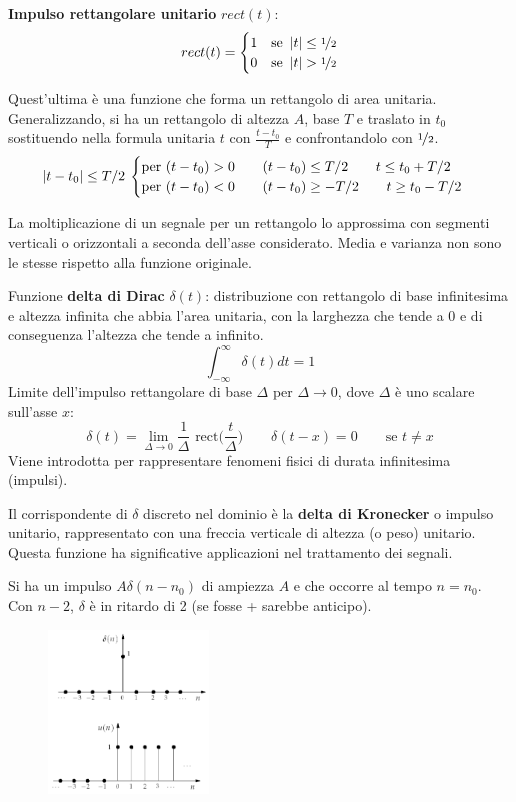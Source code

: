 \textbf{Impulso rettangolare unitario} $rect(t)$:
$$rect(t) = \begin{cases}
1 & \text{se } \left|t\right| \leq \nicefrac{1}{2} \\
0 & \text{se } \left|t\right| > \nicefrac{1}{2}
\end{cases}$$

Quest'ultima è una funzione che forma un rettangolo di area unitaria. Generalizzando, si ha un rettangolo di altezza $A$, base $T$ e traslato in $t_0$ sostituendo nella formula unitaria $t$ con $\frac{t - t_0}{T}$ e confrontandolo con $\nicefrac{1}{2}$.
$$\left|t - t_0\right| \leq T / 2 \: \begin{cases}
\text{per } (t - t_0) > 0 \qquad (t - t_0) \leq T / 2 \qquad t \leq t_0 + T / 2 \\
\text{per } (t - t_0) < 0 \qquad (t - t_0) \geq -T / 2 \qquad t \geq t_0 - T / 2
\end{cases}$$

La moltiplicazione di un segnale per un rettangolo lo approssima con segmenti verticali o orizzontali a seconda dell'asse considerato. Media e varianza non sono le stesse rispetto alla funzione originale.

Funzione \textbf{delta di Dirac} $\delta(t)$: distribuzione con rettangolo di base infinitesima e altezza infinita che abbia l'area unitaria, con la larghezza che tende a 0 e di conseguenza l'altezza che tende a infinito. 
$$\int_{-\infty}^{\infty} \delta(t) dt = 1$$
Limite dell'impulso rettangolare di base $\Delta$ per $\Delta \rightarrow 0$, dove $\Delta$ è uno scalare sull'asse $x$: 
$$\delta(t) = \lim\limits_{\Delta \rightarrow 0} \frac{1}{\Delta} \text{ rect}\Big(\frac{t}{\Delta}\Big) \qquad \delta(t - x) = 0 \qquad \text{se } t \neq x$$
Viene introdotta per rappresentare fenomeni fisici di durata infinitesima (impulsi).

Il corrispondente di $\delta$ discreto nel dominio è la \textbf{delta di Kronecker} o impulso unitario, rappresentato con una freccia verticale di altezza (o peso) unitario. Questa funzione ha significative applicazioni nel trattamento dei segnali. 

Si ha un impulso $A\delta(n - n_0)$ di ampiezza $A$ e che occorre al tempo $n = n_0$. \\
Con $n - 2$, $\delta$ è in ritardo di 2 (se fosse + sarebbe anticipo).

\begin{figure}
	\begin{center}
		\includegraphics[width=0.38\textwidth]{Lezioni/Immagini/gradinodiscreto}
	\end{center}
	\vspace{-80pt}
\end{figure}

